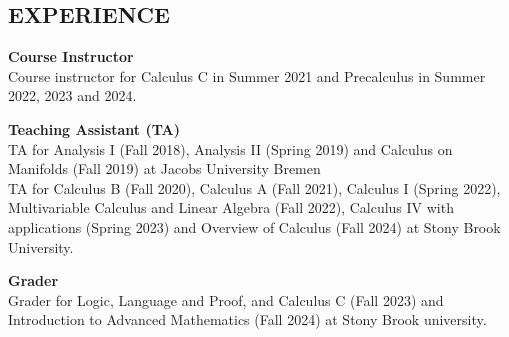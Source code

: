 \documentclass[margin]{res}
\begin{document}
\begin{resume}
\section{EXPERIENCE}
\par
\textbf{Course Instructor}\\
Course instructor for Calculus C in Summer 2021 and Precalculus in Summer 2022, 2023 and 2024.
\par
\textbf{Teaching Assistant (TA)}\\
TA for Analysis I (Fall 2018), Analysis II (Spring 2019) and Calculus on Manifolds (Fall 2019) at Jacobs University Bremen\\
TA  for Calculus B (Fall 2020), Calculus A (Fall 2021), Calculus I (Spring 2022), Multivariable Calculus and Linear Algebra (Fall 2022), Calculus IV with applications (Spring 2023) and Overview of Calculus (Fall 2024) at Stony Brook University.
\par
\textbf{Grader}\\
Grader for Logic, Language and Proof, and Calculus C (Fall 2023) and Introduction to Advanced Mathematics (Fall 2024) at Stony Brook university.



\end{resume}
\end{document}
